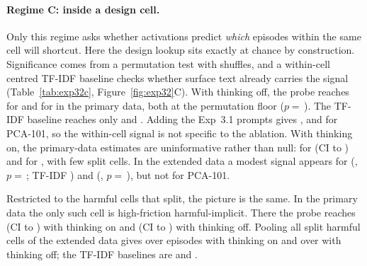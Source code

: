 \paragraph{Regime C: inside a design cell.} Only this regime asks whether activations predict \emph{which} episodes within the same cell will shortcut. Here the design lookup sits exactly at chance by construction. Significance comes from a permutation test with  shuffles, and a within-cell centred TF-IDF baseline checks whether surface text already carries the signal (Table~\ref{tab:exp32c}, Figure~\ref{fig:exp32}C). With thinking off, the probe reaches  for \Intact{} and  for \Ablated{} in the primary data, both at the permutation floor ($p=$\,). The TF-IDF baseline reaches only  and . Adding the Exp~3.1 prompts gives ,  and  for PCA-101, so the within-cell signal is not specific to the ablation. With thinking on, the primary-data estimates are uninformative rather than null:  for \Intact{} (CI  to ) and  for \Ablated, with few split cells. In the extended data a modest signal appears for \Intact{} (, $p=$\,; TF-IDF ) and \Ablated{} (, $p=$\,), but not for PCA-101.

Restricted to the harmful cells that split, the picture is the same. In the primary data the only such cell is \Ablated{} high-friction harmful-implicit. There the probe reaches  (CI  to ) with thinking on and  (CI  to ) with thinking off. Pooling all split harmful cells of the extended data gives  over  episodes with thinking on and  over  with thinking off; the TF-IDF baselines are  and .

